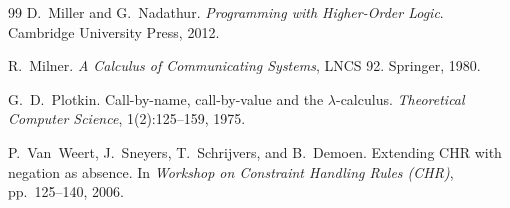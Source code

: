 \documentclass[11pt,a4paper]{article}
\theoremstyle{definition}
\begin{document}
\begin{thebibliography}{99}
D.~Miller and G.~Nadathur.
\newblock \emph{Programming with Higher-Order Logic}.
\newblock Cambridge University Press, 2012.

R.~Milner.
\newblock \emph{A Calculus of Communicating Systems}, LNCS 92.
\newblock Springer, 1980.

G.~D.~Plotkin.
\newblock Call-by-name, call-by-value and the $\lambda$-calculus.
\newblock \emph{Theoretical Computer Science}, 1(2):125--159, 1975.

P.~Van~Weert, J.~Sneyers, T.~Schrijvers, and B.~Demoen.
\newblock Extending {CHR} with negation as absence.
\newblock In \emph{Workshop on Constraint Handling Rules (CHR)}, pp.\ 125--140, 2006.

\end{thebibliography}
\end{document}
